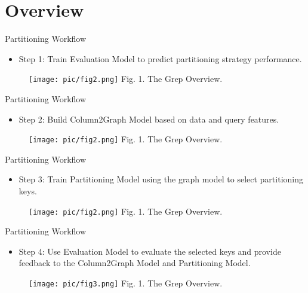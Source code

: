 \documentclass{beamer}
\begin{document}
\section{Overview}
\begin{frame}{Partitioning Workflow}
    \begin{itemize}
        \item Step 1: Train Evaluation Model to predict partitioning strategy performance.
    \end{itemize}
    \begin{figure}[htpb]
        \centering
        \texttt{[image: pic/fig2.png]}
        \tiny{Fig. 1. The Grep Overview.}
    \end{figure}
\end{frame}

\begin{frame}{Partitioning Workflow}
    \begin{itemize}
        \item Step 2: Build Column2Graph Model based on data and query features.
    \end{itemize}
    \begin{figure}[htpb]
        \centering
        \texttt{[image: pic/fig2.png]}
        \tiny{Fig. 1. The Grep Overview.}
    \end{figure}
\end{frame}

\begin{frame}{Partitioning Workflow}
    \begin{itemize}
        \item Step 3: Train Partitioning Model using the graph model to select partitioning keys.
    \end{itemize}
    \begin{figure}[htpb]
        \centering
        \texttt{[image: pic/fig2.png]}
        \tiny{Fig. 1. The Grep Overview.}
    \end{figure}
\end{frame}

\begin{frame}{Partitioning Workflow}
    \begin{itemize}
        \item Step 4: Use Evaluation Model to evaluate the selected keys and provide feedback to the Column2Graph Model and Partitioning Model.
    \end{itemize}
    \begin{figure}[htpb]
        \centering
        \texttt{[image: pic/fig3.png]}
        \tiny{Fig. 1. The Grep Overview.}
    \end{figure}
\end{frame}
\end{document}
